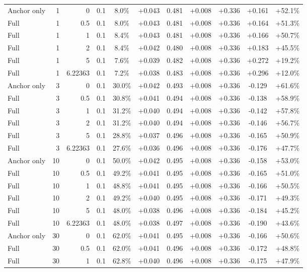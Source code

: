 \begin{table}[htbp]
\begin{tabular}{lrrrccccccc}
Anchor only & 1 & 0 & 0.1 & 8.0\% & +0.043 & 0.481 & +0.008 & +0.336 & +0.161 & +52.1\% \\
Full & 1 & 0.5 & 0.1 & 8.0\% & +0.043 & 0.481 & +0.008 & +0.336 & +0.164 & +51.3\% \\
Full & 1 & 1 & 0.1 & 8.4\% & +0.043 & 0.481 & +0.008 & +0.336 & +0.166 & +50.7\% \\
Full & 1 & 2 & 0.1 & 8.4\% & +0.042 & 0.480 & +0.008 & +0.336 & +0.183 & +45.5\% \\
Full & 1 & 5 & 0.1 & 7.6\% & +0.039 & 0.482 & +0.008 & +0.336 & +0.272 & +19.2\% \\
Full & 1 & 6.22363 & 0.1 & 7.2\% & +0.038 & 0.483 & +0.008 & +0.336 & +0.296 & +12.0\% \\
Anchor only & 3 & 0 & 0.1 & 30.0\% & +0.042 & 0.493 & +0.008 & +0.336 & -0.129 & +61.6\% \\
Full & 3 & 0.5 & 0.1 & 30.8\% & +0.041 & 0.494 & +0.008 & +0.336 & -0.138 & +58.9\% \\
Full & 3 & 1 & 0.1 & 31.2\% & +0.040 & 0.494 & +0.008 & +0.336 & -0.142 & +57.8\% \\
Full & 3 & 2 & 0.1 & 31.2\% & +0.040 & 0.494 & +0.008 & +0.336 & -0.146 & +56.7\% \\
Full & 3 & 5 & 0.1 & 28.8\% & +0.037 & 0.496 & +0.008 & +0.336 & -0.165 & +50.9\% \\
Full & 3 & 6.22363 & 0.1 & 27.6\% & +0.036 & 0.496 & +0.008 & +0.336 & -0.176 & +47.7\% \\
Anchor only & 10 & 0 & 0.1 & 50.0\% & +0.042 & 0.495 & +0.008 & +0.336 & -0.158 & +53.0\% \\
Full & 10 & 0.5 & 0.1 & 49.2\% & +0.041 & 0.495 & +0.008 & +0.336 & -0.165 & +51.0\% \\
Full & 10 & 1 & 0.1 & 48.8\% & +0.041 & 0.495 & +0.008 & +0.336 & -0.166 & +50.5\% \\
Full & 10 & 2 & 0.1 & 49.2\% & +0.040 & 0.495 & +0.008 & +0.336 & -0.171 & +49.3\% \\
Full & 10 & 5 & 0.1 & 48.0\% & +0.038 & 0.496 & +0.008 & +0.336 & -0.184 & +45.2\% \\
Full & 10 & 6.22363 & 0.1 & 48.0\% & +0.038 & 0.497 & +0.008 & +0.336 & -0.190 & +43.6\% \\
Anchor only & 30 & 0 & 0.1 & 62.0\% & +0.041 & 0.495 & +0.008 & +0.336 & -0.166 & +50.6\% \\
Full & 30 & 0.5 & 0.1 & 62.0\% & +0.041 & 0.496 & +0.008 & +0.336 & -0.172 & +48.8\% \\
Full & 30 & 1 & 0.1 & 62.8\% & +0.040 & 0.496 & +0.008 & +0.336 & -0.175 & +47.9\% \\

\end{tabular}
\end{table}
